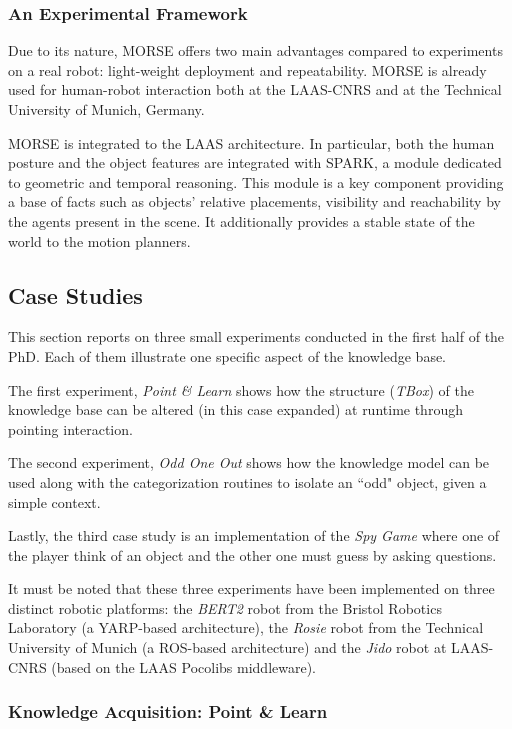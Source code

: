 \subsubsection{An Experimental Framework}

Due to its nature, MORSE offers two main advantages compared to experiments on
a real robot: light-weight deployment and repeatability. MORSE is already used
for human-robot interaction both at the LAAS-CNRS and at the Technical
University of Munich, Germany.

MORSE is integrated to the LAAS architecture.  In particular, both the human
posture and the object features are integrated with SPARK, a
module dedicated to geometric and temporal reasoning.  This module is a key
component providing a base of facts such as objects' relative placements,
visibility and reachability by the agents present in the scene. It additionally
provides a stable state of the world to the motion planners.

\subsection{Case Studies}
\label{sect|casestudies}

This section reports on three small experiments conducted in the first half of
the PhD. Each of them illustrate one specific aspect of the knowledge base.

The first experiment, \emph{Point \& Learn} shows how the structure
(\emph{TBox}) of the knowledge base can be altered (in this case expanded) at
runtime through pointing interaction.

The second experiment, \emph{Odd One Out} shows how the knowledge model can be
used along with the categorization routines to isolate an ``odd" object, given
a simple context.

Lastly, the third case study is an implementation of the \emph{Spy Game} where
one of the player think of an object and the other one must guess by asking
questions.

It must be noted that these three experiments have been implemented on three
distinct robotic platforms: the \textit{BERT2} robot from the Bristol Robotics
Laboratory (a YARP-based architecture), the \textit{Rosie} robot from the
Technical University of Munich (a ROS-based architecture) and the \textit{Jido}
robot at LAAS-CNRS (based on the LAAS Pocolibs middleware).

\subsubsection{Knowledge Acquisition: Point \& Learn}
\label{expe|pointandlearn}

